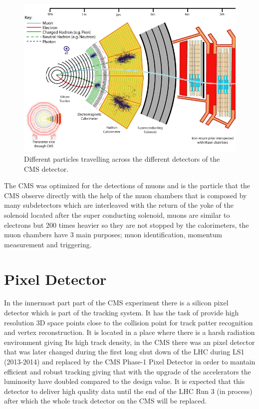 \begin{figure}[H]
    \centering
    \includegraphics[width=1\textwidth]{cms.png}
     \caption[Particles in different detectors on CMS]{Different particles travelling across the different detectors of the CMS detector.\cite{cmspic2}}
    \label{fig:four-forces}
\end{figure}


The CMS was optimized for the detections of muons and is the particle that the CMS observe directly with the help of the muon chambers that is composed by many subdetectors which are interleaved with the return of the yoke of the solenoid located after the super conducting solenoid, muons are similar to electrons but 200 times heavier so they are not stopped by the calorimeters, the muon chambers have 3 main purposes; muon identification, momentum measurement and triggering. \cite{CMS2}

\section{Pixel Detector}

In the innermost part part of the CMS experiment there is a silicon pixel detector which is part of the tracking system. It has the task of provide high resolution 3D space points close to the collision point for track patter recognition and vertex reconstruction. It is located in a place where there is a harsh radiation environment giving Its high track density, in the CMS there was an pixel detector that was later changed during the first long shut down of the LHC during LS1 (2013-2014) and replaced by the CMS Phase-1 Pixel Detector in order to mantain efficient and robust tracking giving that with the upgrade of the accelerators the luminosity have doubled compared to the design value. It is expected that this detector to deliver high quality data until the end of the LHC Run 3 (in process) after which the whole track detector on the CMS will be replaced.
   
